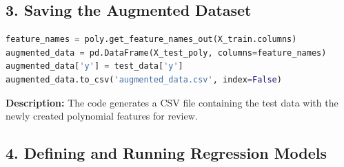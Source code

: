 \subsection*{3. Saving the Augmented Dataset}
\begin{lstlisting}[language=Python, caption={Saving Augmented Data}]
feature_names = poly.get_feature_names_out(X_train.columns)
augmented_data = pd.DataFrame(X_test_poly, columns=feature_names)
augmented_data['y'] = test_data['y']
augmented_data.to_csv('augmented_data.csv', index=False)
\end{lstlisting}
\textbf{Description:} The code generates a CSV file containing the test data with the newly created polynomial features for review.

\subsection*{4. Defining and Running Regression Models}
